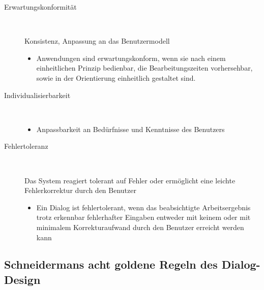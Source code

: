 \documentclass{report}
\begin{document}
\begin{description}
\item[Erwartungskonformität]~\par
Konsistenz, Anpassung an das Benutzermodell
\begin{itemize}
\item  Anwendungen sind erwartungskonform, wenn sie nach einem einheitlichen Prinzip bedienbar, die Bearbeitungszeiten vorhersehbar, sowie in der Orientierung einheitlich gestaltet sind.
\end{itemize}

\item[Individualisierbarkeit]~\par
\begin{itemize}
\item Anpassbarkeit an Bedürfnisse und Kenntnisse des Benutzers
\end{itemize}

\item[Fehlertoleranz]~\par
Das System reagiert tolerant auf Fehler oder ermöglicht eine leichte Fehlerkorrektur durch den Benutzer
\begin{itemize}
\item Ein Dialog ist fehlertolerant, wenn das beabsichtigte Arbeitsergebnis trotz erkennbar fehlerhafter Eingaben entweder mit keinem oder mit minimalem Korrekturaufwand durch den Benutzer erreicht werden kann
\end{itemize}
\end{description}

\newpage

\subsection*{Schneidermans acht goldene Regeln des Dialog-Design}
\end{document}
